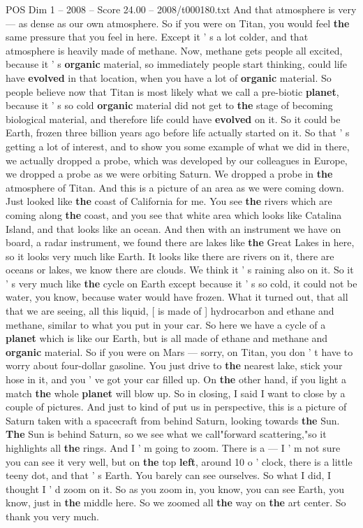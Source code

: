 \begin{textsample}{POS Dim 1 – 2008 – Score 24.00 – 2008/t000180.txt}
And that atmosphere is very — as dense as our own atmosphere.
So if you were on Titan, you would feel \textbf{the} same pressure that you feel in here.
Except it ' s a lot colder, and that atmosphere is heavily made of methane.
Now, methane gets people all excited, because it ' s \textbf{organic} material, so immediately people start thinking, could life have \textbf{evolved} in that location, when you have a lot of \textbf{organic} material.
So people believe now that Titan is most likely what we call a pre-biotic \textbf{planet}, because it ' s so cold \textbf{organic} material did not get to \textbf{the} stage of becoming biological material, and therefore life could have \textbf{evolved} on it.
So it could be Earth, frozen three billion years ago before life actually started on it.
So that ' s getting a lot of interest, and to show you some example of what we did in there, we actually dropped a probe, which was developed by our colleagues in Europe, we dropped a probe as we were orbiting Saturn.
We dropped a probe in \textbf{the} atmosphere of Titan.
And this is a picture of an area as we were coming down.
Just looked like \textbf{the} coast of California for me.
You see \textbf{the} rivers which are coming along \textbf{the} coast, and you see that white area which looks like Catalina Island, and that looks like an ocean.
And then with an instrument we have on board, a radar instrument, we found there are lakes like \textbf{the} Great Lakes in here, so it looks very much like Earth.
It looks like there are rivers on it, there are oceans or lakes, we know there are clouds.
We think it ' s raining also on it.
So it ' s very much like \textbf{the} cycle on Earth except because it ' s so cold, it could not be water, you know, because water would have frozen.
What it turned out, that all that we are seeing, all this liquid, [ is made of ] hydrocarbon and ethane and methane, similar to what you put in your car.
So here we have a cycle of a \textbf{planet} which is like our Earth, but is all made of ethane and methane and \textbf{organic} material.
So if you were on Mars — sorry, on Titan, you don ' t have to worry about four-dollar gasoline.
You just drive to \textbf{the} nearest lake, stick your hose in it, and you ' ve got your car filled up.
On \textbf{the} other hand, if you light a match \textbf{the} whole \textbf{planet} will blow up.
So in closing, I said I want to close by a couple of pictures.
And just to kind of put us in perspective, this is a picture of Saturn taken with a spacecraft from behind Saturn, looking towards \textbf{the} Sun. \textbf{The} Sun is behind Saturn, so we see what we call"forward scattering,"so it highlights all \textbf{the} rings.
And I ' m going to zoom.
There is a — I ' m not sure you can see it very well, but on \textbf{the} top \textbf{left}, around 10 o ' clock, there is a little teeny dot, and that ' s Earth.
You barely can see ourselves.
So what I did, I thought I ' d zoom on it.
So as you zoom in, you know, you can see Earth, you know, just in \textbf{the} middle here.
So we zoomed all \textbf{the} way on \textbf{the} art center.
So thank you very much.


\end{textsample}
